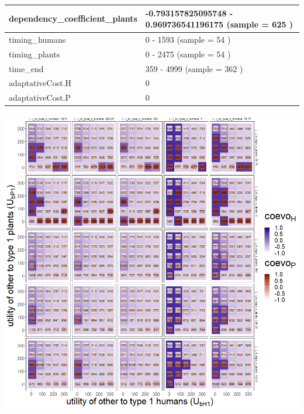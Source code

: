 \documentclass[
]{book}
\begin{document}
\begin{table}[!h]
\begin{tabular}[t]{l|l}
\hline
dependency\_coefficient\_plants & -0.793157825095748 - 0.969736541196175 (sample = 625 )\\
\hline
timing\_humans & 0 - 1593 (sample = 54 )\\
\hline
timing\_plants & 0 - 2475 (sample = 54 )\\
\hline
time\_end & 359 - 4999 (sample = 362 )\\
\hline
adaptativeCost.H & 0\\
\hline
adaptativeCost.P & 0\\
\hline
\end{tabular}
\end{table}

\newpage

\includegraphics[width=1\linewidth]{plots/4_exp_utilities_other_to_populations-tripleRaster_fourParameterss}
\end{document}
